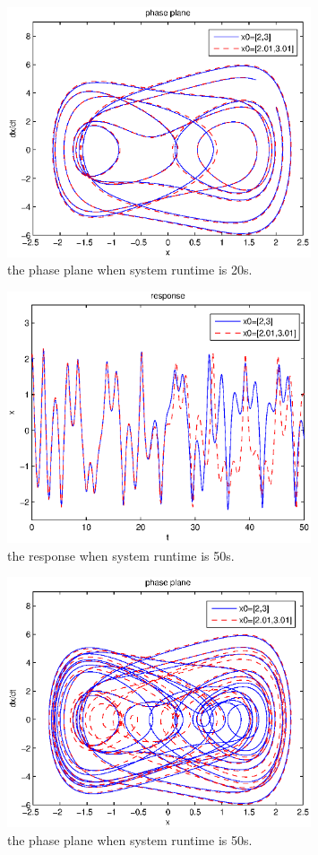 \documentclass{article}
\begin{document}
\begin{figure}
  \centering
  \includegraphics[width=0.8\textwidth]{figs/phase_plane_20.eps}%
  \caption{the phase plane when system runtime is 20s.}
  \label{phase_plane_20}
\end{figure}

\begin{figure}
  \centering
  \includegraphics[width=0.8\textwidth]{figs/response_50.eps}%
  \caption{the response when system runtime is 50s.}
  \label{response_50}
\end{figure}

\begin{figure}
  \centering
  \includegraphics[width=0.8\textwidth]{figs/phase_plane_50.eps}%
  \caption{the phase plane when system runtime is 50s.}
  \label{phase_plane_50}
\end{figure}
\end{document}
